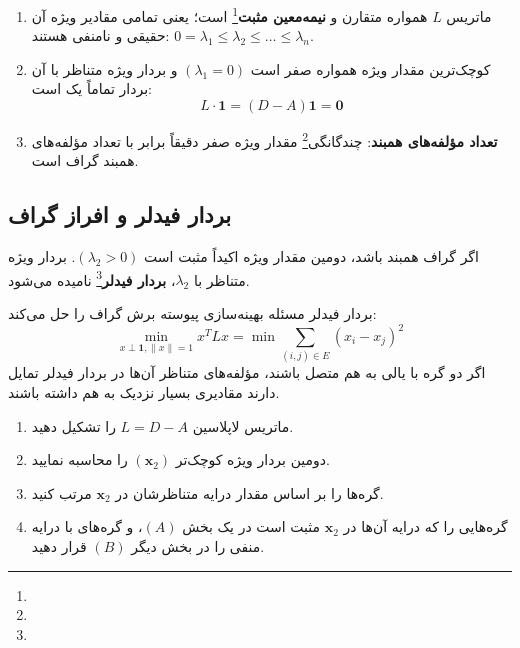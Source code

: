 \begin{theorem}
\begin{enumerate}
    \item ماتریس $L$ همواره متقارن و \textbf{نیمه‌معین مثبت}\footnote{} است؛ یعنی تمامی مقادیر ویژه آن حقیقی و نامنفی هستند: $0 = \lambda_1 \le \lambda_2 \le \dots \le \lambda_n$.
    \item کوچک‌ترین مقدار ویژه همواره صفر است $(\lambda_1 = 0)$ و بردار ویژه متناظر با آن بردار تماماً یک است:
    \begin{equation}
    L \cdot \mathbf{1} = (D - A) \mathbf{1} = \mathbf{0}
    \end{equation}
    \item \textbf{تعداد مؤلفه‌های همبند}: چندگانگی\footnote{} مقدار ویژه صفر دقیقاً برابر با تعداد مؤلفه‌های همبند گراف است.
\end{enumerate}
\end{theorem}

\subsection{بردار فیدلر \texorpdfstring{}{(Fiedler Vector)} و افراز گراف}
اگر گراف همبند باشد، دومین مقدار ویژه اکیداً مثبت است $(\lambda_2 > 0)$. بردار ویژه متناظر با $\lambda_2$، \textbf{بردار فیدلر}\footnote{} نامیده می‌شود.

بردار فیدلر مسئله بهینه‌سازی پیوسته برش گراف را حل می‌کند:
\begin{equation}
\min_{x \perp \mathbf{1}, \|x\|=1} x^T L x = \min \sum_{(i, j) \in E} (x_i - x_j)^2
\end{equation}
اگر دو گره با یالی به هم متصل باشند، مؤلفه‌های متناظر آن‌ها در بردار فیدلر تمایل دارند مقادیری بسیار نزدیک به هم داشته باشند.

\begin{algorithmbox}
\begin{enumerate}
    \item ماتریس لاپلاسین $L = D - A$ را تشکیل دهید.
    \item دومین بردار ویژه کوچک‌تر $(\mathbf{x}_2)$ را محاسبه نمایید.
    \item گره‌ها را بر اساس مقدار درایه متناظرشان در $\mathbf{x}_2$ مرتب کنید.
    \item گره‌هایی را که درایه آن‌ها در $\mathbf{x}_2$ مثبت است در یک بخش $(A)$، و گره‌های با درایه منفی را در بخش دیگر $(B)$ قرار دهید.
\end{enumerate}
\end{algorithmbox}

